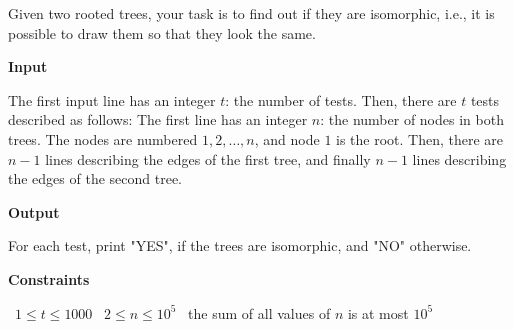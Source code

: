 Given two rooted trees, your task is to find out if they are isomorphic, i.e., it is possible to draw them so that they look the same.

\vspace{0.3cm}\noindent\textbf{Input}

The first input line has an integer $t$: the number of tests. Then, there are $t$ tests described as follows:
The first line has an integer $n$: the number of nodes in both trees. The nodes are numbered $1,2,\dots,n$, and node $1$ is the root.
Then, there are $n-1$ lines describing the edges of the first tree, and finally $n-1$ lines describing the edges of the second tree.

\vspace{0.3cm}\noindent\textbf{Output}

For each test, print "YES", if the trees are isomorphic, and "NO" otherwise.

\vspace{0.3cm}\noindent\textbf{Constraints}

\textbullet\ $1 \le t \le 1000$
\textbullet\ $2 \le n \le 10^5$
\textbullet\ the sum of all values of $n$ is at most $10^5$